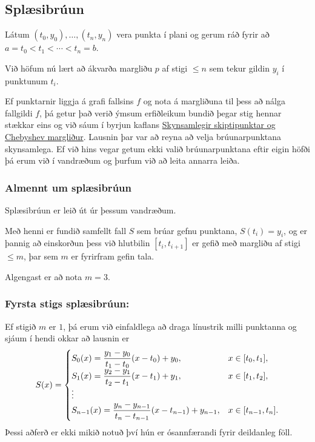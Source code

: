 \documentclass[a4paper,10pt,icelandic]{sphinxmanual}
\begin{document}
\subsection{Splæsibrúun}
\label{kafli03:index-19}\label{kafli03:splaesibruun}
Látum \((t_0,y_0),\dots,(t_n,y_n)\) vera punkta í plani og gerum ráð
fyrir að \(a=t_0<t_1<\cdots<t_n=b\).

Við höfum nú lært að ákvarða margliðu \(p\) af stigi \(\leq n\)
sem tekur gildin \(y_i\) í punktunum \(t_i\).

Ef punktarnir liggja á grafi fallsins \(f\) og nota á margliðuna til
þess að nálga fallgildi \(f\), þá getur það verið ýmsum erfiðleikum
bundið þegar stig hennar stækkar eins og við sáum í byrjun kaflans
{\hyperref[kafli03:skynsamlegir-skiptipunktar-og-chebyshev-margliur]{Skynsamlegir skiptipunktar og Chebyshev margliður}}.
Lausnin þar var að reyna að velja brúunarpunktana skynsamlega. Ef við
hins vegar getum ekki valið brúunarpunktana eftir eigin höfði þá erum
við í vandræðum og þurfum við að leita annarra leiða.


\subsubsection{Almennt um splæsibrúun}
\label{kafli03:almennt-um-splaesibruun}
Splæsibrúun er leið út úr þessum vandræðum.

Með henni er fundið samfellt fall \(S\) sem brúar gefnu punktana,
\(S(t_i)=y_i\), og er þannig að einskorðun þess við hlutbilin
\([t_i,t_{i+1}]\) er gefið með margliðu af stigi \(\leq m\), þar
sem \(m\) er fyrirfram gefin tala.

Algengast er að nota \(m=3\).


\subsubsection{Fyrsta stigs splæsibrúun:}
\label{kafli03:fyrsta-stigs-splaesibruun}\label{kafli03:index-20}
Ef stigið \(m\) er \(1\), þá erum við einfaldlega að draga
línustrik milli punktanna og sjáum í hendi okkar að lausnin er
\begin{gather}
\begin{split}S(x) = \begin{cases}
        S_0(x) = \dfrac {y_1-y_0}{t_1-t_0}(x-t_0)+y_0,
            & x \in [t_0,t_1],\\
        S_1(x) = \dfrac {y_2-y_1}{t_2-t_1}(x-t_1)+y_1,
            & x \in [t_1,t_2],\\
        \vdots & \\
        S_{n-1}(x) = \dfrac {y_n-y_{n-1}}{t_n-t_{n-1}}
            (x-t_{n-1})+y_{n-1}, &x \in [t_{n-1},t_n].
    \end{cases}\end{split}\notag
\end{gather}
Þessi aðferð er ekki mikið notuð því hún er ósannfærandi fyrir
deildanleg föll.
\end{document}
